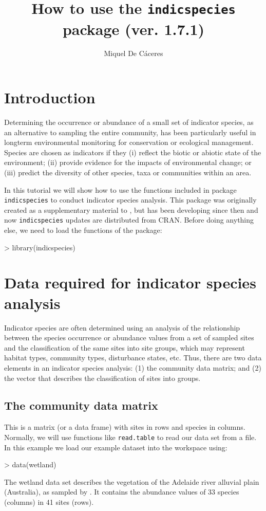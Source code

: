 \documentclass[11pt,a4paper]{article}
\title{How to use the \texttt{indicspecies} package (ver. 1.7.1)}
\author[1]{Miquel De Cáceres}
\affil[1]{Centre Tecnològic Forestal de Catalunya. Ctra. St. Llorenç de Morunys km 2, 25280, Solsona, Catalonia, Spain}
\begin{document}

\maketitle
\tableofcontents

\section{Introduction}
Determining the occurrence or abundance of a small set of indicator species, as an alternative to sampling the entire community, has been particularly useful in longterm environmental monitoring for conservation or ecological management. Species are chosen as indicators if they (i) reflect the biotic or abiotic state of the environment; (ii) provide evidence for the impacts of environmental change; or (iii) predict the diversity of other species, taxa or communities within an area. 

In this tutorial we will show how to use the functions included in package \texttt{indicspecies} to conduct indicator species analysis. This package was originally created as a supplementary material to \citet{DeCaceres2009}, but has been developing since then and now \texttt{indicspecies} updates are distributed from CRAN. Before doing anything else, we need to load the functions of the package:
\begin{Schunk}
\begin{Sinput}
> library(indicspecies)
\end{Sinput}
\end{Schunk}

\section{Data required for indicator species analysis}
Indicator species are often determined using an analysis of the relationship between the species occurrence or abundance values from a set of sampled sites and the classification of the same sites into site groups, which may represent habitat types, community types, disturbance states, etc. Thus, there are two data elements in an indicator species analysis: (1) the community data matrix; and (2) the vector that describes the classification of sites into groups.
\subsection{The community data matrix}
This is a matrix (or a data frame) with sites in rows and species in columns. Normally, we will use functions like \texttt{read.table} to read our data set from a file. In this example we load our example dataset into the workspace using:
\begin{Schunk}
\begin{Sinput}
> data(wetland)
\end{Sinput}
\end{Schunk}
The wetland data set describes the vegetation of the Adelaide river alluvial plain (Australia), as sampled by \citet{Bowman1987}. It contains the abundance values of 33 species (columns) in 41 sites (rows).
\end{document}
